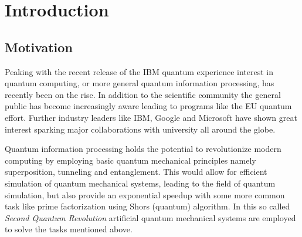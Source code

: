 \chapter{Introduction}
\label{chap:intro}

\section{Motivation}
Peaking with the recent release of the IBM quantum experience interest in quantum computing, or more general quantum information processing, has recently been on the rise. In addition to the scientific community the general public has become increasingly aware leading to programs like the EU quantum effort. Further industry leaders like IBM, Google and Microsoft have shown great interest sparking major collaborations with university all around the globe. 

Quantum information processing holds the potential to revolutionize modern computing by employing basic quantum mechanical principles namely superposition, tunneling and entanglement. This would allow for efficient simulation of quantum mechanical systems, leading to the field of quantum simulation, but also provide an exponential speedup with some more common task like prime factorization using Shors (quantum) algorithm. 
In this so called \textit{Second Quantum Revolution} artificial quantum mechanical systems are employed to solve the tasks mentioned above.

